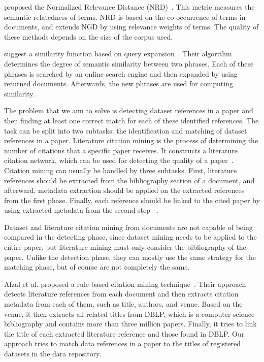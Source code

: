 \documentclass{IOS-Book-Article}
\newcommand{\dara}{\textsf{da\textbar ra}}
\begin{document}
\citeauthor{Schaefer2014} proposed the Normalized Relevance Distance (NRD)~\citeyearpar{Schaefer2014}. This metric measures the semantic relatedness of terms. NRD is based on the co-occurrence of terms in documents, and extends NGD by using relevance weights of terms. The quality of these methods depends on the size of the corpus used.

\citeauthor{Sahami2006} suggest a similarity function based on query expansion~\citeyearpar{Sahami2006}. Their algorithm determines the degree of semantic similarity between two phrases. Each of these phrases is searched by an online search engine and then expanded by using returned documents. Afterwards, the new phrases are used for computing similarity. 

The problem that we aim to solve is detecting dataset references in a paper and then finding at least one correct match for each of these identified references. The task can be split into two subtasks: the identification and matching of dataset references in a paper. Literature citation mining is the process of determining the number of citations that a specific paper receives. It constructs a literature citation network, which can be used for detecting the quality of a paper~\cite{Afzal2010}. Citation mining can usually be handled by three subtasks. First, literature references should be extracted from the bibliography section of a document, and afterward, metadata extraction should be applied on the extracted references from the first phase. Finally, each reference should be linked to the cited paper by using extracted metadata from the second step ~\cite{Afzal2010}.

Dataset and literature citation mining from documents are not capable of being compared in the detecting phase, since dataset mining needs to be applied to the entire paper, but literature mining must only consider the bibliography of the paper. Unlike the detection phase, they can mostly use the same strategy for the matching phase, but of course are not completely the same. 

Afzal et al. proposed a rule-based citation mining technique~\cite{Afzal2010}. Their approach detects literature references from each document and then extracts citation metadata from each of them, such as title, authors, and venue. Based on the venue, it then extracts all related titles from DBLP, which is a computer science bibliography and contains more than three million papers. Finally, it tries to link the title of each extracted literature reference and those found in DBLP. Our approach tries to match data references in a paper to the titles of registered datasets in the {\dara} repository.
\end{document}

